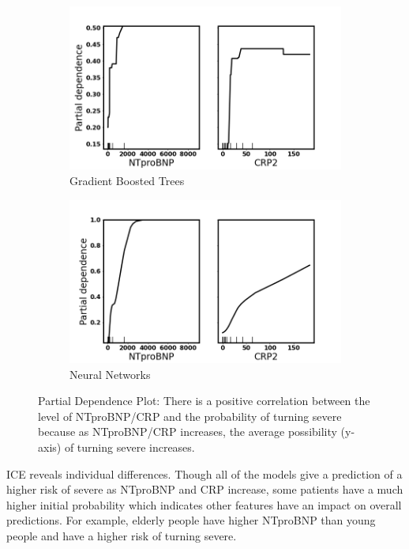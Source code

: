 \begin{figure}[H]\ContinuedFloat
\centering
\begin{subfigure}[b]{0.85\textwidth}
    \centering
    \includegraphics[width=\textwidth]{figures/chapter_interp/xgbc_pdp_crp_ntproBNP.png}
    \caption{Gradient Boosted Trees}
    \label{fig:gbt_pdp}
\end{subfigure}
\begin{subfigure}[b]{0.85\textwidth}
    \centering
    \includegraphics[width=\textwidth]{figures/chapter_interp/nn_pdp_crp_ntproBNP.png}
    \caption{Neural Networks}
    \label{fig:nn_pdp}
\end{subfigure}
\caption{Partial Dependence Plot: There is a positive correlation between the level of NTproBNP/CRP and the probability of turning severe because as NTproBNP/CRP increases, the average possibility (y-axis) of turning severe increases.}
\label{fig.pdp}
\end{figure}

ICE reveals individual differences. Though all of the models give a prediction of a higher risk of severe as NTproBNP and CRP increase, some patients have a much higher initial probability which indicates other features have an impact on overall predictions. For example, elderly people have higher NTproBNP than young people and have a higher risk of turning severe.

